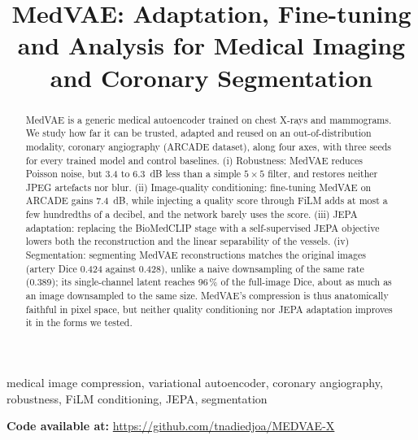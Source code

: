 \documentclass[conference]{IEEEtran}
\begin{document}
\pagestyle{plain}

\title{MedVAE: Adaptation, Fine-tuning and Analysis for Medical Imaging and Coronary Segmentation}

\author{
}


\maketitle

\begin{abstract}
MedVAE is a generic medical autoencoder trained on chest X-rays and mammograms. We study how far it can be trusted, adapted and reused on an out-of-distribution modality, coronary angiography (ARCADE dataset), along four axes, with three seeds for every trained model and control baselines. (i) Robustness: MedVAE reduces Poisson noise, but 3.4 to 6.3~dB less than a simple $5\times5$ filter, and restores neither JPEG artefacts nor blur. (ii) Image-quality conditioning: fine-tuning MedVAE on ARCADE gains 7.4~dB, while injecting a quality score through FiLM adds at most a few hundredths of a decibel, and the network barely uses the score. (iii) JEPA adaptation: replacing the BioMedCLIP stage with a self-supervised JEPA objective lowers both the reconstruction and the linear separability of the vessels. (iv) Segmentation: segmenting MedVAE reconstructions matches the original images (artery Dice 0.424 against 0.428), unlike a naive downsampling of the same rate (0.389); its single-channel latent reaches 96\,\% of the full-image Dice, about as much as an image downsampled to the same size. MedVAE's compression is thus anatomically faithful in pixel space, but neither quality conditioning nor JEPA adaptation improves it in the forms we tested.
\end{abstract}

\begin{IEEEkeywords}
medical image compression, variational autoencoder, coronary angiography, robustness, FiLM conditioning, JEPA, segmentation
\end{IEEEkeywords}

{\small\noindent\textbf{Code available at:} \url{https://github.com/tnadiedjoa/MEDVAE-X}}

\bigskip
\end{document}
